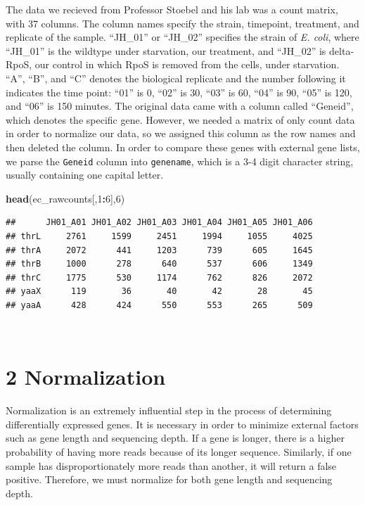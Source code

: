 \documentclass[]{article}
\newenvironment{Shaded}{\begin{snugshade}}{\end{snugshade}}
\newcommand{\KeywordTok}[1]{\textcolor[rgb]{0.13,0.29,0.53}{\textbf{#1}}}
\newcommand{\DecValTok}[1]{\textcolor[rgb]{0.00,0.00,0.81}{#1}}
\newcommand{\OperatorTok}[1]{\textcolor[rgb]{0.81,0.36,0.00}{\textbf{#1}}}
\newcommand{\NormalTok}[1]{#1}
\begin{document}
The data we recieved from Professor Stoebel and his lab was a count
matrix, with 37 columns. The column names specify the strain, timepoint,
treatment, and replicate of the sample. ``JH\_01'' or ``JH\_02''
specifies the strain of \emph{E. coli}, where ``JH\_01'' is the wildtype
under starvation, our treatment, and ``JH\_02'' is delta-RpoS, our
control in which RpoS is removed from the cells, under starvation.
``A'', ``B'', and ``C'' denotes the biological replicate and the number
following it indicates the time point: ``01'' is 0, ``02'' is 30, ``03''
is 60, ``04'' is 90, ``05'' is 120, and ``06'' is 150 minutes. The
original data came with a column called ``Geneid'', which denotes the
specific gene. However, we needed a matrix of only count data in order
to normalize our data, so we assigned this column as the row names and
then deleted the column. In order to compare these genes with external
gene lists, we parse the \texttt{Geneid} column into \texttt{genename},
which is a 3-4 digit character string, usually containing one capital
letter. \(~\)

\begin{Shaded}
\begin{Highlighting}[]
\KeywordTok{head}\NormalTok{(ec_rawcounts[,}\DecValTok{1}\OperatorTok{:}\DecValTok{6}\NormalTok{],}\DecValTok{6}\NormalTok{)}
\end{Highlighting}
\end{Shaded}

\begin{verbatim}
##      JH01_A01 JH01_A02 JH01_A03 JH01_A04 JH01_A05 JH01_A06
## thrL     2761     1599     2451     1994     1055     4025
## thrA     2072      441     1203      739      605     1645
## thrB     1000      278      640      537      606     1349
## thrC     1775      530     1174      762      826     2072
## yaaX      119       36       40       42       28       45
## yaaA      428      424      550      553      265      509
\end{verbatim}

\(~\)

\section{\texorpdfstring{\textbf{2}
Normalization}{2 Normalization}}\label{normalization}

Normalization is an extremely influential step in the process of
determining differentially expressed genes. It is necessary in order to
minimize external factors such as gene length and sequencing depth. If a
gene is longer, there is a higher probability of having more reads
because of its longer sequence. Similarly, if one sample has
disproportionately more reads than another, it will return a false
positive. Therefore, we must normalize for both gene length and
sequencing depth.
\end{document}
